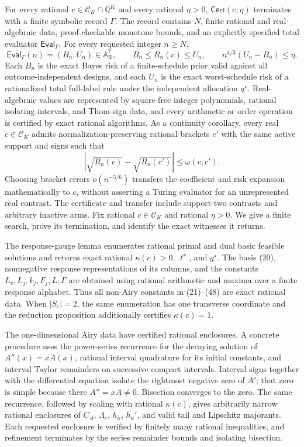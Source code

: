For every rational \(c\in\mathcal C_K\cap\mathbb Q^K\) and every rational \(\eta>0\), \(\mathsf{Cert}(c,\eta)\) terminates with a finite symbolic record \(\Gamma\). The record contains \(N\), finite rational and real-algebraic data, proof-checkable monotone bounds, and an explicitly specified total evaluator \(\mathsf{Eval}_{\Gamma}\). For every requested integer \(n\ge N\),
\[
\mathsf{Eval}_{\Gamma}(n)=(B_n,U_n)\in\mathbb A_{\mathrm R}^2,
\qquad B_n\le R_n(c)\le U_n,
\qquad n^{4/3}(U_n-B_n)\le\eta.
\]
Each \(B_n\) is the exact Bayes risk of a finite-schedule prior valid against all outcome-independent designs, and each \(U_n\) is the exact worst-schedule risk of a rationalized total full-label rule under the independent allocation \(q^\star\). Real-algebraic values are represented by square-free integer polynomials, rational isolating intervals, and Thom-sign data, and every arithmetic or order operation is certified by exact rational algorithms. As a continuity corollary, every real \(c\in\mathcal C_K\) admits normalization-preserving rational brackets \(c'\) with the same active support and signs such that
\[
|\sqrt{R_n(c)}-\sqrt{R_n(c')}|\le\omega(c,c').
\]
Choosing bracket errors \(o(n^{-5/6})\) transfers the coefficient and risk expansion mathematically to \(c\), without asserting a Turing evaluator for an unrepresented real contrast.  The certificate and transfer include support-two contrasts and arbitrary inactive arms.
Fix rational \(c\in\mathcal C_K\) and rational \(\eta>0\).  We give a finite search, prove its termination, and identify the exact witnesses it returns.

The response-gauge lemma enumerates rational primal and dual basic feasible solutions and returns exact rational \(\kappa(c)>0\), \(\ell^\star\), and \(g^\star\).  The basis (20), nonnegative response representations of its columns, and the constants \(L_v,L_j,k_j,F_j,L,\Gamma\) are obtained using rational arithmetic and maxima over a finite response alphabet.  Thus all non-Airy constants in (21)--(48) are exact rational data.  When \(|S_c|=2\), the same enumeration has one transverse coordinate and the reduction proposition additionally certifies \(\kappa(c)=1\).

The one-dimensional Airy data have certified rational enclosures.  A concrete procedure uses the power-series recurrence for the decaying solution of \(A''(x)=xA(x)\), rational interval quadrature for its initial constants, and interval Taylor remainders on successive compact intervals.  Interval signs together with the differential equation isolate the rightmost negative zero of \(A'\); that zero is simple because there \(A''=xA\ne0\).  Bisection converges to the zero.  The same recurrence, followed by scaling with rational \(\kappa(c)\), gives arbitrarily narrow rational enclosures of \(C_A\), \(\Lambda_c\), \(h_\kappa\), \(h_\kappa'\), and valid tail and Lipschitz majorants.  Each requested enclosure is verified by finitely many rational inequalities, and refinement terminates by the series remainder bounds and isolating bisection.

